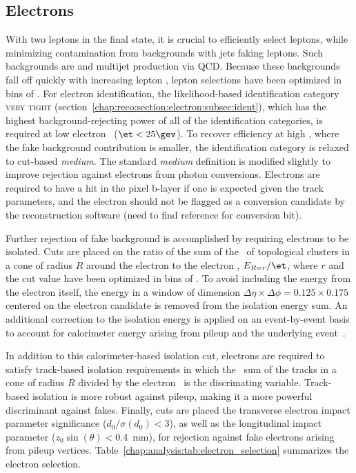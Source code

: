 
\subsection{Electrons}
\label{chap:analysis:sec:objects:subsec:electrons}

With two leptons in the final state, it is crucial to efficiently
select leptons, while minimizing contamination from backgrounds with
jets faking leptons. Such backgrounds are \wjets and multijet production
via QCD. Because these backgrounds fall off quickly with increasing
lepton \pt, lepton selections have been optimized in bins of \pt. For
electron identification, the likelihood-based identification category
\textsc{very tight}
(section~\ref{chap:reco:section:electron:subsec:ident}), which has the
highest background-rejecting power of all of the identification
categories, is required at low electron \et~($\et < 25 \gev$). To
recover efficiency at high \et, where the fake background
contribution is smaller, the identification category is relaxed to
cut-based {\it medium}. The standard {\it medium} definition is
modified slightly to improve rejection against electrons from photon
conversions. Electrons are required to have a hit in the pixel b-layer
if one is expected given the track parameters, and the electron should
not be flagged as a conversion candidate by the reconstruction
software (need to find reference for conversion bit). 

Further rejection of fake background is accomplished by requiring
electrons to be isolated. Cuts are placed on the ratio of the sum of
the \et~of topological clusters in a
cone of radius $R$ around the electron to the electron \et,
$E_{R=r}/\et$, where $r$ and the cut value have been optimized in bins
of \et. To avoid including the energy from the electron itself, the
energy in a window of dimension $\Delta \eta \times \Delta \phi =
0.125 \times 0.175$ centered on the electron candidate is removed from
the isolation energy sum. An additional correction to the isolation
energy is applied on an event-by-event basis to account for
calorimeter energy arising from pileup and the underlying
event~\cite{bib:Cacciari:2007fd}.

In addition to this calorimeter-based
isolation cut, electrons are required to satisfy track-based isolation
requirements in which
the \pt~sum of the tracks in a cone of radius $R$ divided by the
electron \et~is the discrimating variable. Track-based isolation is
more robust against pileup, making it a more powerful discriminant
against fakes. Finally, cuts are placed the transverse
electron impact parameter significance ($d_0/\sigma (d_0) < 3$), as well as the
longitudinal impact parameter ($z_0\sin(\theta) < 0.4$~mm), for
rejection against fake electrons arising from pileup
vertices. Table~\ref{chap:analysis:tab:electron_selection} summarizes
the electron selection.

